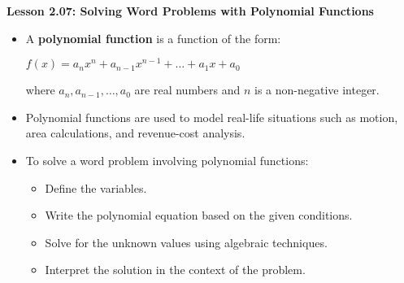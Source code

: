 \begin{center}
\textbf{Lesson 2.07: Solving Word Problems with Polynomial Functions}
\end{center}

\vspace*{-1.5ex}


\begin{itemize}
    \item A \textbf{polynomial function} is a function of the form:

{\centering $
    f(x) = a_n x^n + a_{n-1}x^{n-1} + \dots + a_1x + a_0
    $\par}
  
    where $a_n, a_{n-1}, \dots, a_0$ are real numbers and $n$ is a non-negative integer.
    
    \item Polynomial functions are used to model real-life situations such as motion, area calculations, and revenue-cost analysis.
    
    \item To solve a word problem involving polynomial functions:
    \begin{itemize}
        \item Define the variables.
        \item Write the polynomial equation based on the given conditions.
        \item Solve for the unknown values using algebraic techniques.
        \item Interpret the solution in the context of the problem.
    \end{itemize}
    
\end{itemize}



